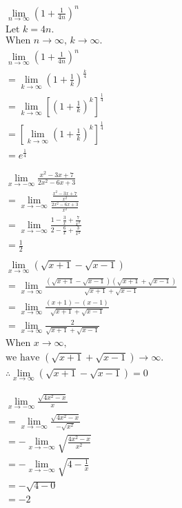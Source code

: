 \documentclass{article}
\begin{document}
\begin{multicols}{3}
\noindent\begin{align*}
	&\lim_{n \to \infty} (1+\frac{1}{4n})^n \\
	&\text{Let $k=4n$.} \\
	&\text{When $n \to \infty$, $k \to \infty$.} \\
	&\lim_{n \to \infty} (1+\frac{1}{4n})^n \\
	&= \lim_{k \to \infty} (1+\frac{1}{k})^{\frac{k}{4}} \\
	&= \lim_{k \to \infty} [(1+\frac{1}{k})^k]^{\frac{1}{4}} \\
	&= [\lim_{k \to \infty} (1+\frac{1}{k})^k]^{\frac{1}{4}} \\
	&= e^{\frac{1}{4}} \\
	\\
	\\
	&\lim_{x \to -\infty} \frac{x^2-3x+7}{2x^2-6x+3} \\
	&= \lim_{x \to -\infty} \frac{\frac{x^2-3x+7}{x^2}}{\frac{2x^2-6x+3}{x^2}} \\
	&= \lim_{x \to -\infty} \frac{1-\frac{3}{x}+\frac{7}{x^2}}{2-\frac{6}{x}+\frac{3}{x^2}} \\
	&= \frac{1}{2}
	\\
	\\
	&\lim_{x \to \infty} (\sqrt{x+1}-\sqrt{x-1}) \\
	&= \lim_{x \to \infty} \frac{(\sqrt{x+1}-\sqrt{x-1})(\sqrt{x+1}+\sqrt{x-1})}{\sqrt{x+1}+\sqrt{x-1}} \\
	&= \lim_{x \to \infty} \frac{(x+1)-(x-1)}{\sqrt{x+1}+\sqrt{x-1}} \\
	&= \lim_{x \to \infty} \frac{2}{\sqrt{x+1}+\sqrt{x-1}} \\
	&\text{When $x \to \infty$,} \\
	&\text{we have $(\sqrt{x+1}+\sqrt{x-1}) \to \infty$.} \\
	&\therefore \lim_{x \to \infty} (\sqrt{x+1}-\sqrt{x-1}) = 0 \\
	\\
	\\
	&\lim_{x \to -\infty} \frac{\sqrt{4x^2-x}}{x} \\
	&= \lim_{x \to -\infty} \frac{\sqrt{4x^2-x}}{-\sqrt{x^2}} \\
	&= -\lim_{x \to -\infty} \sqrt{\frac{4x^2-x}{x^2}} \\
	&= -\lim_{x \to -\infty} \sqrt{4-\frac{1}{x}} \\
	&= -\sqrt{4-0} \\
	&= -2
\end{align*}

\end{multicols}
\end{document}
